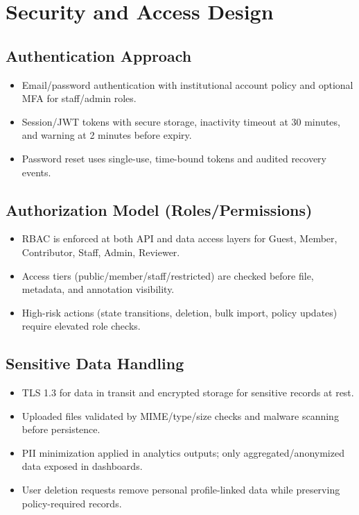 \documentclass[12pt,a4paper]{article}
\begin{document}
\section{Security and Access Design}
\subsection*{Authentication Approach}
\begin{itemize}
    \item Email/password authentication with institutional account policy and optional MFA for staff/admin roles.
    \item Session/JWT tokens with secure storage, inactivity timeout at 30 minutes, and warning at 2 minutes before expiry.
    \item Password reset uses single-use, time-bound tokens and audited recovery events.
\end{itemize}

\subsection*{Authorization Model (Roles/Permissions)}
\begin{itemize}
    \item RBAC is enforced at both API and data access layers for Guest, Member, Contributor, Staff, Admin, Reviewer.
    \item Access tiers (public/member/staff/restricted) are checked before file, metadata, and annotation visibility.
    \item High-risk actions (state transitions, deletion, bulk import, policy updates) require elevated role checks.
\end{itemize}

\subsection*{Sensitive Data Handling}
\begin{itemize}
    \item TLS 1.3 for data in transit and encrypted storage for sensitive records at rest.
    \item Uploaded files validated by MIME/type/size checks and malware scanning before persistence.
    \item PII minimization applied in analytics outputs; only aggregated/anonymized data exposed in dashboards.
    \item User deletion requests remove personal profile-linked data while preserving policy-required records.
\end{itemize}
\end{document}
